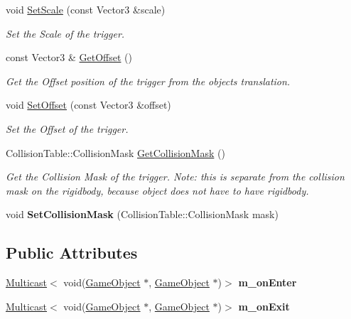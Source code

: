 \begin{DoxyCompactItemize}
void \hyperlink{classTriggerComponent_add3b5a16e795c2cbd20600329cefd1b6}{Set\+Scale} (const Vector3 \&scale)
\begin{DoxyCompactList}\small\item\em Set the Scale of the trigger. \end{DoxyCompactList}\item 
const Vector3 \& \hyperlink{classTriggerComponent_a81caada870d7dd9b0cf665495dfcea99}{Get\+Offset} ()
\begin{DoxyCompactList}\small\item\em Get the Offset position of the trigger from the objects translation. \end{DoxyCompactList}\item 
void \hyperlink{classTriggerComponent_a2c4f80d4162ca6903d96fb7e88a26496}{Set\+Offset} (const Vector3 \&offset)
\begin{DoxyCompactList}\small\item\em Set the Offset of the trigger. \end{DoxyCompactList}\item 
Collision\+Table\+::\+Collision\+Mask \hyperlink{classTriggerComponent_ac94c9219efe3efa94cef732485115a46}{Get\+Collision\+Mask} ()
\begin{DoxyCompactList}\small\item\em Get the Collision Mask of the trigger. Note\+: this is separate from the collision mask on the rigidbody, because object does not have to have rigidbody. \end{DoxyCompactList}\item 
\mbox{\label{classTriggerComponent_af8904c927816d997c9f3bedf853f618a}} 
void {\bfseries Set\+Collision\+Mask} (Collision\+Table\+::\+Collision\+Mask mask)
\end{DoxyCompactItemize}
\subsection*{Public Attributes}
\begin{DoxyCompactItemize}
\item 
\mbox{\label{classTriggerComponent_ab9e7fc9cdda17d7cb7e8cd8be4f935df}} 
\hyperlink{classMulticast}{Multicast}$<$ void(\hyperlink{classGameObject}{Game\+Object} $\ast$, \hyperlink{classGameObject}{Game\+Object} $\ast$)$>$ {\bfseries m\+\_\+on\+Enter}
\item 
\mbox{\label{classTriggerComponent_a25d91357b3090fd3f4474566f485e842}} 
\hyperlink{classMulticast}{Multicast}$<$ void(\hyperlink{classGameObject}{Game\+Object} $\ast$, \hyperlink{classGameObject}{Game\+Object} $\ast$)$>$ {\bfseries m\+\_\+on\+Exit}
\end{DoxyCompactItemize}
